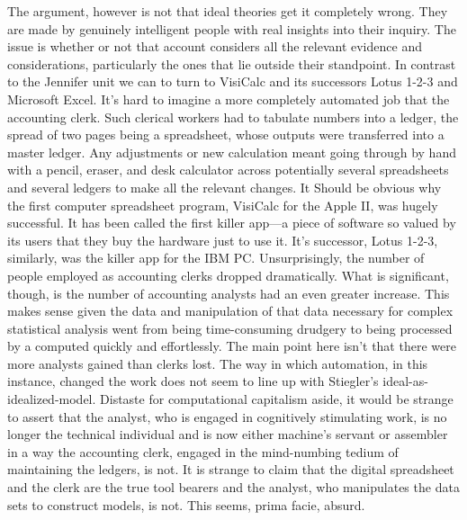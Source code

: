 \documentclass[letterpaper,notitlepage,12pt]{article}
\begin{document}
The argument, however is not that ideal theories get it completely wrong.
They are made by genuinely intelligent people with real insights into their
inquiry.
The issue is whether or not that account considers all the relevant evidence and
considerations, particularly the ones that lie outside their standpoint.
In contrast to the Jennifer unit we can to turn to VisiCalc and its successors
Lotus 1-2-3 and Microsoft Excel.
It's hard to imagine a more completely automated job that the accounting clerk.
Such clerical workers had to tabulate numbers into a ledger, the spread of two
pages being a spreadsheet, whose outputs were transferred into a master ledger.
Any adjustments or new calculation meant going through by hand with a pencil,
eraser, and desk calculator across potentially several spreadsheets and several
ledgers to make all the relevant changes.
It Should be obvious why the first computer spreadsheet program, VisiCalc for
the Apple II, was hugely successful.
It has been called the first killer app---a piece of software so valued by its
users that they buy the hardware just to use it.
It's successor, Lotus 1-2-3, similarly, was the killer app for the IBM PC.
Unsurprisingly, the number of people employed as accounting clerks dropped
dramatically.
What is significant, though, is the number of accounting analysts had an even
greater increase.
This makes sense given the data and manipulation of that data necessary for
complex statistical analysis went from being time-consuming drudgery to being
processed by a computed quickly and effortlessly.
The main point here isn't that there were more analysts gained than clerks lost.
The way in which automation, in this instance, changed the work does not seem to
line up with Stiegler's ideal-as-idealized-model.
Distaste for computational capitalism aside, it would be strange to assert that
the analyst, who is engaged in cognitively stimulating work, is no longer the
technical individual and is now either machine's servant or assembler in a way
the accounting clerk, engaged in the mind-numbing tedium of maintaining the
ledgers, is not.
It is strange to claim that the digital spreadsheet and the clerk are the true
tool bearers and the analyst, who manipulates the data sets to construct models,
is not.
This seems, prima facie, absurd.
\end{document}
